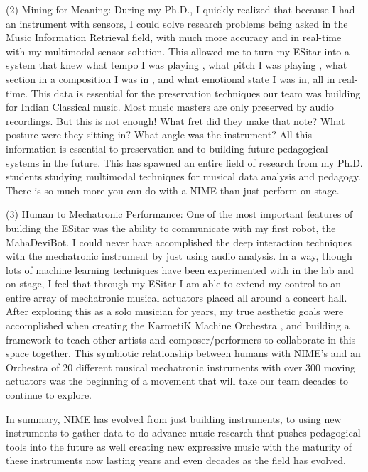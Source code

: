 (2) Mining for Meaning: During my Ph.D., I quickly realized that because I had an instrument with sensors, I could solve research problems being asked in the Music Information Retrieval field, with much more accuracy and in real-time with my multimodal sensor solution. This allowed me to turn my ESitar into a system that knew what tempo I was playing \cite{Benning:2007}
, what pitch I was playing \cite{Kapur:2007}, what section in a composition I was in \cite{Eigenfeldt:2008}, and what emotional state I was in,  all in real-time. This data is essential for the preservation techniques our team was building for Indian Classical music. Most music masters are only preserved by audio recordings. But this is not enough! What fret did they make that note? What posture were they sitting in? What angle was the instrument? All this information is essential to preservation and to building future pedagogical systems in the future. This has spawned an entire field of research from my Ph.D. students studying multimodal techniques for musical data analysis and pedagogy. There is so much more you can do with a NIME than just perform on stage. 

(3) Human to Mechatronic Performance:  One of the most important features of building the ESitar was the ability to communicate with my first robot, the MahaDeviBot. I could never have accomplished the deep interaction techniques with the mechatronic instrument by just using audio analysis. In a way, though lots of machine learning techniques have been experimented with in the lab and on stage, I feel that through my ESitar I am able to extend my control to an entire array of mechatronic musical actuators placed all around a concert hall. After exploring this as a solo musician for years, my true aesthetic goals were accomplished when creating the KarmetiK Machine Orchestra \cite{Kapur:2011}, and building a framework to teach other artists and composer/performers to collaborate in this space together. This symbiotic relationship between humans with NIME's and an Orchestra of 20 different musical mechatronic instruments with over 300 moving actuators was the beginning of a movement that will take our team decades to continue to explore. 

In summary, NIME has evolved from just building instruments, to using new instruments to gather data to do advance music research that pushes pedagogical tools into the future as well  creating new expressive music with the maturity of these instruments now lasting years and even decades as the field has evolved.


